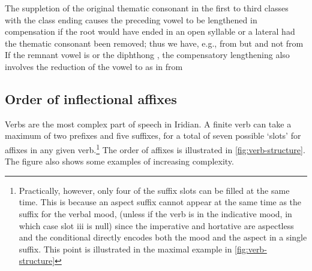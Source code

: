 The suppletion of the original thematic consonant in the first to third classes
with the class ending causes the preceding vowel to be lengthened in
compensation if the root would have ended in an open syllable or a lateral had
the thematic consonant been removed; thus we have, e.g.,  from
 but  and not
 from  If the remnant vowel
is  or the diphthong , the compensatory lengthening also involves
the reduction of the vowel to  as in  from

\subsection{Order of inflectional affixes}\label{sec:order-affixes}

Verbs are the most complex part of speech in Iridian. A finite verb can take a
maximum of two prefixes and five suffixes, for a total of seven possible `slots'
for affixes in any given verb.\footnote{Practically, however, only four of the
suffix slots can be filled at the same time. This is because an aspect suffix
cannot appear at the same time as the suffix for the verbal mood, (unless if the
verb is in the indicative mood, in which case slot {\sc iii} is null) since the
imperative and hortative are aspectless and the conditional directly encodes
both the mood and the aspect in a single suffix. This point is illustrated in
the maximal example  in \ref{fig:verb-structure}} The
order of affixes is illustrated in \ref{fig:verb-structure}. The figure also
shows some examples of increasing complexity.

